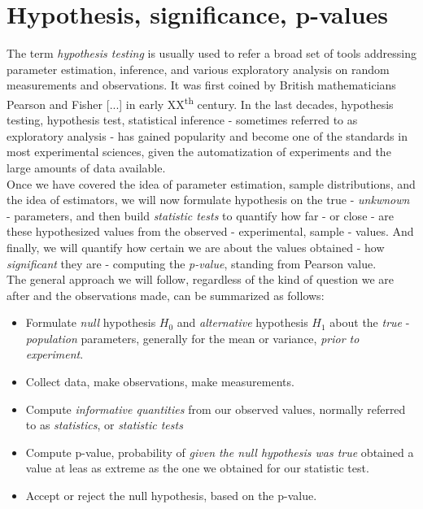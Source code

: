 \documentclass{book}
\begin{document}
\section{Hypothesis, significance, p-values}
The term \textit{hypothesis testing} is usually used to refer a broad set of tools addressing parameter estimation, inference, and various exploratory analysis on random measurements and observations. It was first coined by British mathematicians Pearson and Fisher [...] in early XX\textsuperscript{th} century. In the last decades, hypothesis testing, hypothesis test, statistical inference - sometimes referred to as  exploratory analysis - has gained popularity and become one of the standards in most experimental sciences, given the automatization of experiments and the large amounts of data available.\\

Once we have covered the idea of parameter estimation, sample distributions, and the idea of estimators, we will now formulate hypothesis on the true - \textit{unkwnown} - parameters, and then build \textit{statistic tests} to quantify how far - or close - are these hypothesized values from the observed - experimental, sample - values. And finally, we will quantify how certain we are about the values obtained - how \textit{significant} they are - computing the \textit{p-value}, standing from Pearson value.\\ The general approach we will follow, regardless of the kind of question we are after and the observations made, can be summarized as follows:

\begin{itemize}
\item Formulate \textit{null} hypothesis $H_0$ and \textit{alternative} hypothesis $H_1$ about the \textit{true} - \textit{population} parameters, generally for the mean or variance, \textit{prior to experiment}.
\item Collect data, make observations, make measurements.
\item Compute \textit{informative quantities} from our observed values, normally referred to as \textit{statistics}, or \textit{statistic tests}
\item Compute p-value, probability of \textit{given the null hypothesis was true} obtained a value at leas as extreme as the one we obtained for our statistic test.
\item Accept or reject the null hypothesis, based on the p-value.
\end{itemize}
\end{document}
